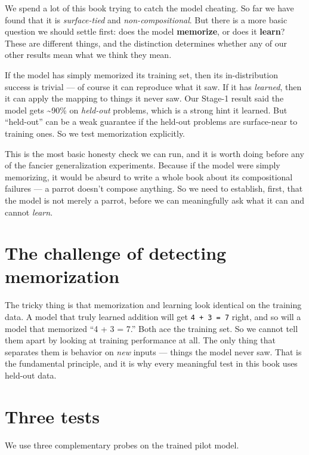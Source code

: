 We spend a lot of this book trying to catch the model cheating. So far
we have found that it is \emph{surface-tied} and
\emph{non-compositional}. But there is a more basic question we should
settle first: does the model \textbf{memorize}, or does it
\textbf{learn}? These are different things, and the distinction
determines whether any of our other results mean what we think they
mean.

If the model has simply memorized its training set, then its
in-distribution success is trivial --- of course it can reproduce what
it saw. If it has \emph{learned}, then it can apply the mapping to
things it never saw. Our Stage-1 result said the model gets
\textasciitilde90\% on \emph{held-out} problems, which is a strong hint
it learned. But ``held-out'' can be a weak guarantee if the held-out
problems are surface-near to training ones. So we test memorization
explicitly.

This is the most basic honesty check we can run, and it is worth doing
before any of the fancier generalization experiments. Because if the
model were simply memorizing, it would be absurd to write a whole book
about its compositional failures --- a parrot doesn't compose anything.
So we need to establish, first, that the model is not merely a parrot,
before we can meaningfully ask what it can and cannot \emph{learn}.

\section{The challenge of detecting
memorization}\label{the-challenge-of-detecting-memorization}

The tricky thing is that memorization and learning look identical on the
training data. A model that truly learned addition will get
\texttt{4\ +\ 3\ =\ 7} right, and so will a model that memorized ``4 + 3
= 7.'' Both ace the training set. So we cannot tell them apart by
looking at training performance at all. The only thing that separates
them is behavior on \emph{new} inputs --- things the model never saw.
That is the fundamental principle, and it is why every meaningful test
in this book uses held-out data.

\section{Three tests}\label{three-tests}

We use three complementary probes on the trained pilot model.

